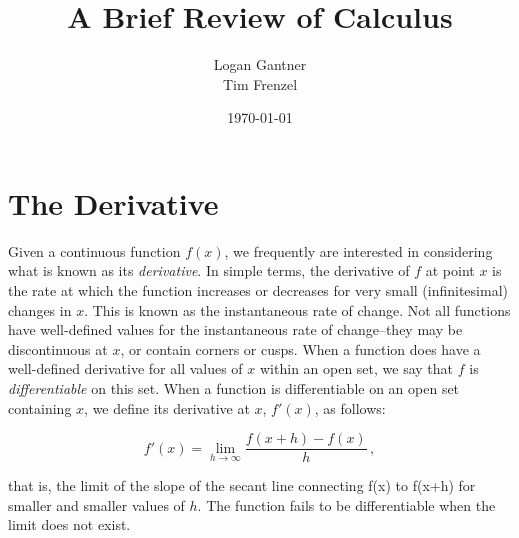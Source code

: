 \documentclass[aps,pra,notitlepage,amsmath,amssymb,letterpaper,12pt]{revtex4-1}
\begin{document}
 
\title{A Brief Review of Calculus}
\author{Logan Gantner \\[-7pt] Tim Frenzel}
\date{\today}

\maketitle

\section{The Derivative} %


\noindent
Given a continuous function $f(x)$, we frequently are interested in considering what is known as its \emph{derivative}. In simple terms, the derivative of $f$ at point $x$ is the rate at which the function increases or decreases for very small (infinitesimal) changes in $x$. This is known as the instantaneous rate of change. Not all functions have well-defined values for the instantaneous rate of change--they may be discontinuous at $x$, or contain corners or cusps. When a function does have a well-defined derivative for all values of $x$ within an open set, we say that $f$ is \emph{differentiable} on this set. When a function is differentiable on an open set containing $x$, we define its derivative at $x$, $f'(x)$, as follows:

\begin{equation}
f'(x) = \lim_{h \rightarrow \infty} \frac{f(x+h) - f(x)}{h} \,,
\end{equation}

\noindent
that is, the limit of the slope of the secant line connecting f(x) to f(x+h) for smaller and smaller values of $h$. The function fails to be differentiable when the limit does not exist.
 
 
\end{document}
